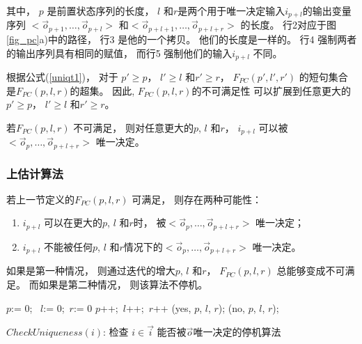 其中，
$p$ 是前置状态序列的长度，
$l$ 和$r$是两个用于唯一决定输入$i_{p+l}$的输出变量序列
$<\vec{o}_{p+1},\dots,\vec{o}_{p+l}>$ 和$<\vec{o}_{p+l+1},\dots,\vec{o}_{p+l+r}>$
的长度。
行2对应于图\ref{fig_pc}a)中的路径，
行3 是他的一个拷贝。
他们的长度是一样的。
行4 强制两者的输出序列具有相同的赋值，
而行5 强制他们的输入$i_{p+l}$ 不同。

根据公式(\ref{uniqt1})，
对于 $p'\ge p$， $l'\ge l$ 和$r'\ge r$，
$F_{PC}(p',l',r')$ 的短句集合是$F_{PC}(p,l,r)$的超集。
因此,
$F_{PC}(p,l,r)$的不可满足性
可以扩展到任意更大的$p'\ge p$， $l'\ge l$ 和$r'\ge r$。


\begin{proposition}\label{prop_pc1}
若$F_{PC}(p,l,r)$ 不可满足，
则对任意更大的$p$, $l$ 和$r$，
$i_{p+l}$ 可以被$<\vec{o}_{p},\dots,\vec{o}_{p+l+r}>$ 唯一决定。
\end{proposition}


\subsubsection{上估计算法}\label{subsub_complete}

若上一节定义的$F_{PC}(p,l,r)$ 可满足，
则存在两种可能性：
\begin{enumerate}
 \item
$i_{p+l}$ 可以在更大的$p$, $l$ 和$r$时，
被$<\vec{o}_{p},\dots,\vec{o}_{p+l+r}>$ 唯一决定；
 \item
$i_{p+l}$ 不能被任何$p$, $l$ 和$r$情况下的$<\vec{o}_{p},\dots,\vec{o}_{p+l+r}>$ 唯一决定。
\end{enumerate}

如果是第一种情况，
则通过迭代的增大$p$, $l$ 和$r$，
$F_{PC}(p,l,r)$ 总能够变成不可满足。
而如果是第二种情况，
则该算法不停机。



\begin{algorithm}[t]
\begin{algorithmic}[1]
\STATE $p$:= 0; ~$l$:= 0;~$r$:= 0\;
\STATE   $p$++;~$l$++;~$r$++\;\label{linepc1}
    \RETURN (yes, $p$, $l$, $r$);
   \label{lnsat}
    \RETURN (no, $p$, $l$, $r$);
   \ENDIF
\ENDWHILE
\caption{$CheckUniqueness(i)$: 检查
$i\in\vec{i}$ 能否被$\vec{o}$唯一决定的停机算法}
\label{alg_pcln}
\end{algorithmic}
\end{algorithm}



